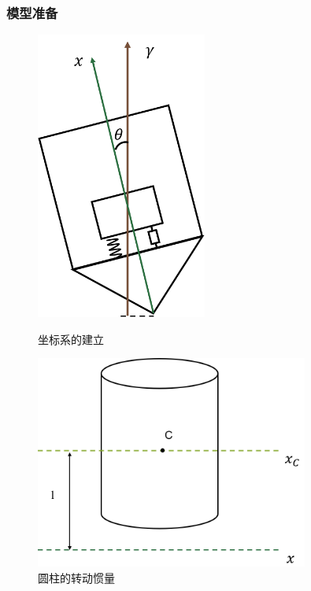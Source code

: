\documentclass{my_paper}
\begin{document}
\subsubsection{模型准备}
\begin{figure}[!htbp]
    \centering
    \begin{minipage}[t]{0.48\textwidth}
    \centering
    \includegraphics[width=0.5\textwidth]{轴2.png}
    \label{zhou two}
    \caption{坐标系的建立}
    \end{minipage}
    \begin{minipage}[t]{0.48\textwidth}
    \centering
    \includegraphics[width=0.8\textwidth]{圆柱.png}
    \caption{圆柱的转动惯量}
    \end{minipage}
    \end{figure}
    
\end{document}
